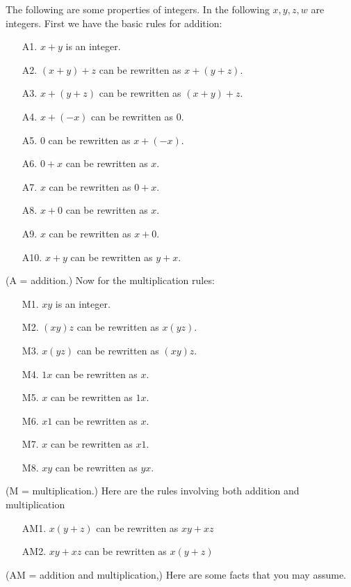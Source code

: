 


\renewcommand\TITLE{Assignment 3}


\topmatter

The following are some properties of integers.
In the following $x, y, z, w$ are integers.
First we have the basic rules for addition:
\begin{enumerate}
\item [A1.] $x + y$ is an integer.
\item [A2.] $(x + y) + z$ can be rewritten as $x + (y + z)$.
\item [A3.] $x + (y + z)$ can be rewritten as $(x + y) + z$.
\item [A4.] $x + (-x)$ can be rewritten as $0$.
\item [A5.] $0$ can be rewritten as $x + (-x)$.
\item [A6.] $0 + x$ can be rewritten as $x$.
\item [A7.] $x$ can be rewritten as $0 + x$.
\item [A8.] $x + 0$ can be rewritten as $x$.
\item [A9.] $x$ can be rewritten as $x + 0$.
\item [A10.] $x + y$ can be rewritten as $y + x$.
\end{enumerate}
(A = addition.)
Now for the multiplication rules:
\begin{enumerate}
\item [M1.] $xy$ is an integer.
\item [M2.] $(xy)z$ can be rewritten as $x(yz)$.
\item [M3.] $x(yz)$ can be rewritten as $(xy)z$.
\item [M4.] $1x$ can be rewritten as $x$.
\item [M5.] $x$ can be rewritten as $1x$.
\item [M6.] $x1$ can be rewritten as $x$.
\item [M7.] $x$ can be rewritten as $x1$.
\item [M8.] $xy$ can be rewritten as $yx$.
\end{enumerate}
(M = multiplication.)
Here are the rules involving both addition and multiplication
\begin{enumerate}
\item [AM1.] $x(y + z)$ can be rewritten as $xy + xz$
\item [AM2.] $xy + xz$ can be rewritten as $x(y + z)$
\end{enumerate}
(AM = addition and multiplication,)
Here are some facts that you may assume.
